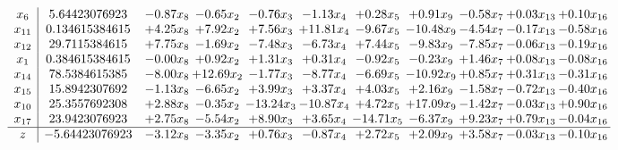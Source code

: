 \documentclass[9pt]{article}
\begin{document}
\[\begin{array}{c| c c@{\hskip 2pt} c@{\hskip 2pt} c@{\hskip 2pt} c@{\hskip 2pt} c@{\hskip 2pt} c@{\hskip 2pt} c@{\hskip 2pt} c@{\hskip 2pt} c@{\hskip 2pt} }
 x_{6}   &  5.64423076923 & -0.87 x_{8} & -0.65 x_{2} & -0.76 x_{3} & -1.13 x_{4} & +  0.28 x_{5} & +  0.91 x_{9} & -0.58 x_{7} & +  0.03 x_{13} & +  0.10 x_{16}\\
 x_{11}   &  0.134615384615 & +  4.25 x_{8} & +  7.92 x_{2} & +  7.56 x_{3} & + 11.81 x_{4} & -9.67 x_{5} & -10.48 x_{9} & -4.54 x_{7} & -0.17 x_{13} & -0.58 x_{16}\\
 x_{12}   &  29.7115384615 & +  7.75 x_{8} & -1.69 x_{2} & -7.48 x_{3} & -6.73 x_{4} & +  7.44 x_{5} & -9.83 x_{9} & -7.85 x_{7} & -0.06 x_{13} & -0.19 x_{16}\\
 x_{1}   &  0.384615384615 & -0.00 x_{8} & +  0.92 x_{2} & +  1.31 x_{3} & +  0.31 x_{4} & -0.92 x_{5} & -0.23 x_{9} & +  1.46 x_{7} & +  0.08 x_{13} & -0.08 x_{16}\\
 x_{14}   &  78.5384615385 & -8.00 x_{8} & + 12.69 x_{2} & -1.77 x_{3} & -8.77 x_{4} & -6.69 x_{5} & -10.92 x_{9} & +  0.85 x_{7} & +  0.31 x_{13} & -0.31 x_{16}\\
 x_{15}   &  15.8942307692 & -1.13 x_{8} & -6.65 x_{2} & +  3.99 x_{3} & +  3.37 x_{4} & +  4.03 x_{5} & +  2.16 x_{9} & -1.58 x_{7} & -0.72 x_{13} & -0.40 x_{16}\\
 x_{10}   &  25.3557692308 & +  2.88 x_{8} & -0.35 x_{2} & -13.24 x_{3} & -10.87 x_{4} & +  4.72 x_{5} & + 17.09 x_{9} & -1.42 x_{7} & -0.03 x_{13} & +  0.90 x_{16}\\
 x_{17}   &  23.9423076923 & +  2.75 x_{8} & -5.54 x_{2} & +  8.90 x_{3} & +  3.65 x_{4} & -14.71 x_{5} & -6.37 x_{9} & +  9.23 x_{7} & +  0.79 x_{13} & -0.04 x_{16}\\
\hline
z    &  -5.64423076923 & -3.12 x_{8} & -3.35 x_{2} & +  0.76 x_{3} & -0.87 x_{4} & +  2.72 x_{5} & +  2.09 x_{9} & +  3.58 x_{7} & -0.03 x_{13} & -0.10 x_{16}\\
\end{array}\]
\end{document}
